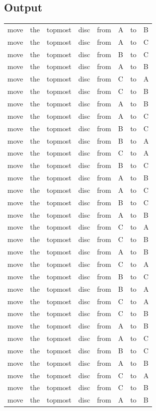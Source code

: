 \documentclass[11pt]{article}
\begin{document}
\subsection*{Output}
\label{sec-2-6}
\begin{center}
\begin{tabular}{llllllll}
move & the & topmost & disc & from & A & to & B\\
move & the & topmost & disc & from & A & to & C\\
move & the & topmost & disc & from & B & to & C\\
move & the & topmost & disc & from & A & to & B\\
move & the & topmost & disc & from & C & to & A\\
move & the & topmost & disc & from & C & to & B\\
move & the & topmost & disc & from & A & to & B\\
move & the & topmost & disc & from & A & to & C\\
move & the & topmost & disc & from & B & to & C\\
move & the & topmost & disc & from & B & to & A\\
move & the & topmost & disc & from & C & to & A\\
move & the & topmost & disc & from & B & to & C\\
move & the & topmost & disc & from & A & to & B\\
move & the & topmost & disc & from & A & to & C\\
move & the & topmost & disc & from & B & to & C\\
move & the & topmost & disc & from & A & to & B\\
move & the & topmost & disc & from & C & to & A\\
move & the & topmost & disc & from & C & to & B\\
move & the & topmost & disc & from & A & to & B\\
move & the & topmost & disc & from & C & to & A\\
move & the & topmost & disc & from & B & to & C\\
move & the & topmost & disc & from & B & to & A\\
move & the & topmost & disc & from & C & to & A\\
move & the & topmost & disc & from & C & to & B\\
move & the & topmost & disc & from & A & to & B\\
move & the & topmost & disc & from & A & to & C\\
move & the & topmost & disc & from & B & to & C\\
move & the & topmost & disc & from & A & to & B\\
move & the & topmost & disc & from & C & to & A\\
move & the & topmost & disc & from & C & to & B\\
move & the & topmost & disc & from & A & to & B\\
\end{tabular}
\end{center}
\end{document}
